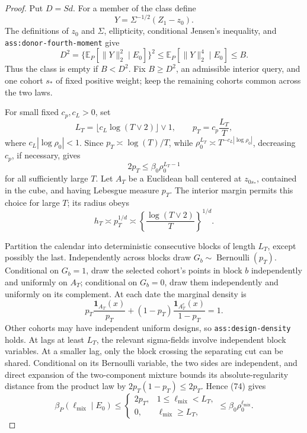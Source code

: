 \documentclass{article}
\begin{document}
\begin{proof}
Put \(D=Sd\).  For a member of the class define
\[
Y=\Sigma^{-1/2}(Z_1-z_0).
\]
The definitions of \(z_0\) and \(\Sigma\), ellipticity, conditional Jensen's inequality, and \texttt{ass:donor-fourth-moment} give
\[
D^2
=\{\mathbb E_P[\|Y\|_2^2\mid E_0]\}^2
\leq\mathbb E_P[\|Y\|_2^4\mid E_0]
\leq B.
\tag{73}
\]
Thus the class is empty if \(B<D^2\).  Fix \(B\geq D^2\), an admissible interior query, and one cohort \(s_*\) of fixed positive weight; keep the remaining cohorts common across the two laws.

For small fixed \(c_p,c_L>0\), set
\[
L_T=\lfloor c_L\log(T\vee2)\rfloor\vee1,
\qquad
p_T=c_p\frac{L_T}{T},
\]
where \(c_L|\log\rho_0|<1\).  Since \(p_T\asymp\log(T)/T\), while
\(\rho_0^{L_T}\asymp T^{-c_L|\log\rho_0|}\), decreasing \(c_p\), if necessary, gives
\[
2p_T\leq\beta_0\rho_0^{L_T-1}
\tag{74}
\]
for all sufficiently large \(T\).  Let \(A_T\) be a Euclidean ball centered at \(z_{0s_*}\), contained in the cube, and having Lebesgue measure \(p_T\).  The interior margin permits this choice for large \(T\); its radius obeys
\[
h_T\asymp p_T^{1/d}
\asymp\left\{\frac{\log(T\vee2)}T\right\}^{1/d}.
\tag{75}
\]

Partition the calendar into deterministic consecutive blocks of length \(L_T\), except possibly the last.  Independently across blocks draw \(G_b\sim\operatorname{Bernoulli}(p_T)\).  Conditional on \(G_b=1\), draw the selected cohort's points in block \(b\) independently and uniformly on \(A_T\); conditional on \(G_b=0\), draw them independently and uniformly on its complement.  At each date the marginal density is
\[
p_T\frac{\mathbf1_{A_T}(x)}{p_T}
+(1-p_T)\frac{\mathbf1_{A_T^c}(x)}{1-p_T}=1.
\tag{76}
\]
Other cohorts may have independent uniform designs, so \texttt{ass:design-density} holds.  At lags at least \(L_T\), the relevant sigma-fields involve independent block variables.  At a smaller lag, only the block crossing the separating cut can be shared.  Conditional on its Bernoulli variable, the two sides are independent, and direct expansion of the two-component mixture bounds its absolute-regularity distance from the product law by \(2p_T(1-p_T)\leq2p_T\).  Hence (74) gives
\[
\beta_P(\ell_{\mathrm{mix}}\mid E_0)
\leq
\begin{cases}
2p_T,&1\leq\ell_{\mathrm{mix}}<L_T,\\
0,&\ell_{\mathrm{mix}}\geq L_T,
\end{cases}
\leq\beta_0\rho_0^{\ell_{\mathrm{mix}}}.
\tag{77}
\]


\end{proof}
\end{document}
